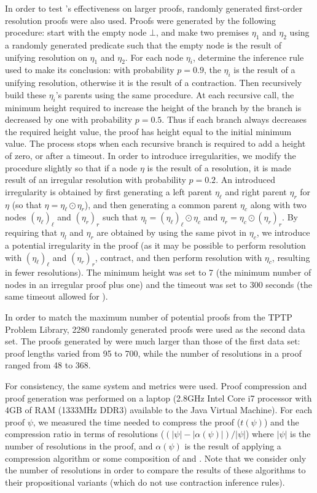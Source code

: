 {In order to test {\FORPI}'s effectiveness on larger proofs, randomly generated first-order resolution proofs were also used.
Proofs were generated by the following procedure: start with the empty node $\bot$, and make two premises $\eta_1$ and $\eta_2$ using a randomly generated predicate such that the empty node is the result of unifying resolution on $\eta_1$ and $\eta_2$. For each node $\eta_i$, determine the inference rule used to make its conclusion: with probability $p=0.9$, the $\eta_i$ is the result of a unifying resolution, otherwise it is the result of a contraction. Then recursively build these $\eta_i$'s parents using the same procedure. At each recursive call, the minimum height required to increase the height of the branch by the branch is decreased by one with probability $p=0.5$. Thus if each branch always decreases the required height value, the proof has height equal to the initial minimum value. The process stops when each recursive branch is required to add a height of zero, or after a timeout. 
In order to introduce irregularities, we modify the procedure slightly so that if a node $\eta$ is the result of a resolution, it is made result of an irregular resolution with probability $p=0.2$. An introduced irregularity is obtained by first generating a left parent $\eta_\ell$ and right parent $\eta_r$ for $\eta$ (so that $\eta = \eta_\ell \odot \eta_r$), and then generating a common parent $\eta_c$ along with two nodes $(\eta_\ell)_\ell$ and $(\eta_r)_r$ such that $\eta_l = (\eta_\ell)_\ell \odot \eta_c$ and $\eta_r = \eta_c \odot (\eta_r)_r$. By requiring that $\eta_l$ and $\eta_r$ are obtained by using the same pivot in $\eta_c$, we introduce a potential irregularity in the proof (as it may be possible to perform resolution with $(\eta_\ell)_\ell$ and $(\eta_r)_r$, contract, and then perform resolution with $\eta_c$, resulting in fewer resolutions). The minimum height was set to 7 (the minimum number of nodes in an irregular proof plus one) and the timeout was set to 300 seconds (the same timeout allowed for {\SPASS}).


In order to match the maximum number of potential proofs from the TPTP Problem Library, 2280 randomly generated proofs were used as the second data set. The proofs generated by were much larger than those of the first data set: proof lengths varied from 95 to 700, while the number of resolutions in a proof ranged from 48 to 368.

For consistency, the same system and metrics were used. Proof compression and proof generation was performed on a laptop (2.8GHz Intel Core i7 processor with 4GB of RAM (1333MHz DDR3) available to the Java Virtual Machine). For each proof $\psi$, we measured the time needed to compress the proof ($t(\psi)$) and the compression ratio in terms of resolutions ($(|\psi|-|\alpha(\psi)|)/|\psi|$) where $|\psi|$ is the number of resolutions in the proof, and $\alpha(\psi)$ is the result of applying a compression algorithm or some composition of {\FORPI} and {\GFOLU}. Note that we consider only the number of resolutions in order to compare the results of these algorithms to their propositional variants (which do not use contraction inference rules).

}
